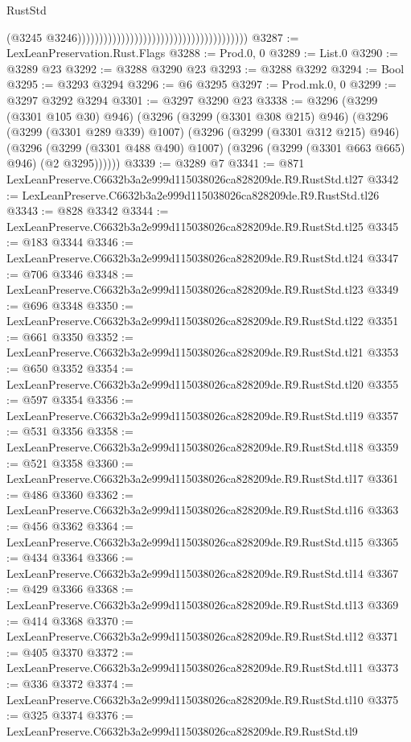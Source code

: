 \begin{lexlean}{RustStd}
\begin{coremodule}
                                                                                (@3245
                                                                                  @3246)))))))))))))))))))))))))))))))))))))))
@3287 := LexLeanPreservation.Rust.Flags
@3288 := Prod.{0, 0}
@3289 := List.{0}
@3290 := @3289 @23
@3292 := @3288 @3290 @23
@3293 := @3288 @3292
@3294 := Bool
@3295 := @3293 @3294
@3296 := @6 @3295
@3297 := Prod.mk.{0, 0}
@3299 := @3297 @3292 @3294
@3301 := @3297 @3290 @23
@3338 := @3296
    (@3299 (@3301 @105 @30) @946)
    (@3296
      (@3299 (@3301 @308 @215) @946)
      (@3296
        (@3299 (@3301 @289 @339) @1007)
        (@3296
          (@3299 (@3301 @312 @215) @946)
          (@3296
            (@3299 (@3301 @488 @490) @1007)
            (@3296 (@3299 (@3301 @663 @665) @946) (@2 @3295))))))
@3339 := @3289 @7
@3341 := @871 LexLeanPreserve.C6632b3a2e999d115038026ca828209de.R9.RustStd.tl27
@3342 := LexLeanPreserve.C6632b3a2e999d115038026ca828209de.R9.RustStd.tl26
@3343 := @828 @3342
@3344 := LexLeanPreserve.C6632b3a2e999d115038026ca828209de.R9.RustStd.tl25
@3345 := @183 @3344
@3346 := LexLeanPreserve.C6632b3a2e999d115038026ca828209de.R9.RustStd.tl24
@3347 := @706 @3346
@3348 := LexLeanPreserve.C6632b3a2e999d115038026ca828209de.R9.RustStd.tl23
@3349 := @696 @3348
@3350 := LexLeanPreserve.C6632b3a2e999d115038026ca828209de.R9.RustStd.tl22
@3351 := @661 @3350
@3352 := LexLeanPreserve.C6632b3a2e999d115038026ca828209de.R9.RustStd.tl21
@3353 := @650 @3352
@3354 := LexLeanPreserve.C6632b3a2e999d115038026ca828209de.R9.RustStd.tl20
@3355 := @597 @3354
@3356 := LexLeanPreserve.C6632b3a2e999d115038026ca828209de.R9.RustStd.tl19
@3357 := @531 @3356
@3358 := LexLeanPreserve.C6632b3a2e999d115038026ca828209de.R9.RustStd.tl18
@3359 := @521 @3358
@3360 := LexLeanPreserve.C6632b3a2e999d115038026ca828209de.R9.RustStd.tl17
@3361 := @486 @3360
@3362 := LexLeanPreserve.C6632b3a2e999d115038026ca828209de.R9.RustStd.tl16
@3363 := @456 @3362
@3364 := LexLeanPreserve.C6632b3a2e999d115038026ca828209de.R9.RustStd.tl15
@3365 := @434 @3364
@3366 := LexLeanPreserve.C6632b3a2e999d115038026ca828209de.R9.RustStd.tl14
@3367 := @429 @3366
@3368 := LexLeanPreserve.C6632b3a2e999d115038026ca828209de.R9.RustStd.tl13
@3369 := @414 @3368
@3370 := LexLeanPreserve.C6632b3a2e999d115038026ca828209de.R9.RustStd.tl12
@3371 := @405 @3370
@3372 := LexLeanPreserve.C6632b3a2e999d115038026ca828209de.R9.RustStd.tl11
@3373 := @336 @3372
@3374 := LexLeanPreserve.C6632b3a2e999d115038026ca828209de.R9.RustStd.tl10
@3375 := @325 @3374
@3376 := LexLeanPreserve.C6632b3a2e999d115038026ca828209de.R9.RustStd.tl9

\end{coremodule}
\end{lexlean}
